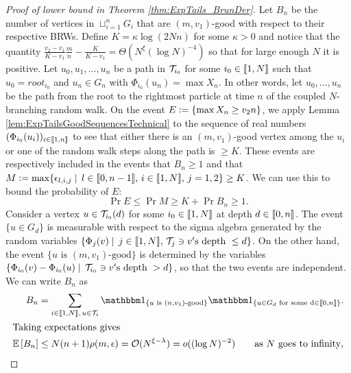 \begin{proof}[Proof of lower bound in Theorem \ref{thm:ExpTails_BrunDer}]
 Let $B_n$ be the number of vertices in $\sqcup_{i=1}^n G_i$ that are $(m, v_1)$-good with respect to their respective BRWs. Define $K = \kappa \log (2Nn)$ for some $\kappa > 0$ and notice that the quantity $\frac{v_2 - v_1}{K - v_1}\frac{m}{n} - \frac{K}{K - v_1} = \Theta(N^\xi (\log N)^{-4})$ so that for large enough $N$ it is positive. Let $u_0, u_1, ..., u_n$ be a path in $\cal{T}_{i_0}$ for some $i_0 \in \bbracket{1,N}$ such that $u_0 = root_{i_0}$ and $u_n \in G_n$ with $\Phi_{i_0}(u_n) = \max X_n$. In other words, let $u_0, ..., u_n$ be the path from the root to the rightmost particle at time $n$ of the coupled $N$-branching random walk. On the event $E \defeq \{ \max X_n \geq v_2 n \}$, we apply Lemma \ref{lem:ExpTailsGoodSequencesTechnical} to the sequence of real numbers $(\Phi_{i_0}(u_i))_{i \in \bbracket{1,n}}$ to see that either there is an $(m, v_1)$-good vertex among the $u_i$ or one of the random walk steps along the path is $ \geq K$. These events are respectively included in the events that $B_n \geq 1$ and that $M \defeq \max \{\epsilon_{l, i, j} \mid\, l \in \bbracket{0, n - 1},\, i \in \bbracket{1,N},\, j = 1,2 \} \geq K$. We can use this to bound the probability of $E$:
\begin{equation}
\Pr{E} \leq \Pr{M \geq K} + \Pr{B_n \geq 1}. 
\end{equation}
Consider a vertex $u \in \cal{T}_{i_0}(d)$ for some $i_0 \in \bbracket{1,N}$ at depth $d \in \bbracket{0, n}$. The event $\{u \in G_d\}$ is measurable with respect to the sigma algebra generated by the random variables $\{ \Phi_j(v) \mid\, j \in \bbracket{1, N},\,\cal{T}_j \ni v'\text{s depth }\leq d\}$. On the other hand, the event $\{ u \text{ is }(m, v_1) \text{-good}\}$ is determined by the variables $\{ \Phi_{i_0}(v) - \Phi_{i_0}(u) \mid\, \cal{T}_{i_0} \ni v'\text{s depth }> d\}$, so that the two events are independent. We can write $B_n$ as 
\begin{align*}
B_n &= \sum\limits_{i \in \bbracket{1,N},\,u \in \cal{T}_i} \Ind_{\{u \text{ is } (n, v_1)\text{-good}\}} \Ind_{\{u \in G_d \text{ for some d} \in \bbracket{0,n}\}}. \\
\intertext{Taking expectations gives}\label{eqn:B_nOrder}
\Ex{B_n} &\leq N(n+1)\rho(m, \epsilon) = \cal{O}(N^{\xi -\lambda}) = o((\log N)^{-2}) \qquad\text{as $N$ goes to infinity}, 
\end{align*}

\end{proof}
